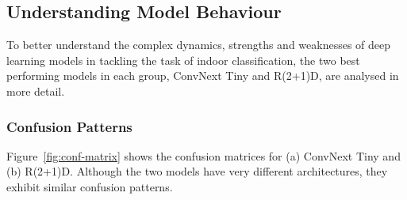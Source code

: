 \documentclass[a4paper]{article}
\begin{document}

\subsection{Understanding Model Behaviour} %
\label{sub:conf-matrices}

To better understand the complex dynamics, strengths and weaknesses of deep
learning models in tackling the task of indoor classification, the two best
performing models in each group, ConvNext Tiny and R(2+1)D, are analysed in more
detail.

\subsubsection{Confusion Patterns} %

Figure~\ref{fig:conf-matrix} shows the confusion matrices for (a) ConvNext Tiny
and (b) R(2+1)D. Although the two models have very different
architectures, they exhibit similar confusion patterns.
\end{document}
